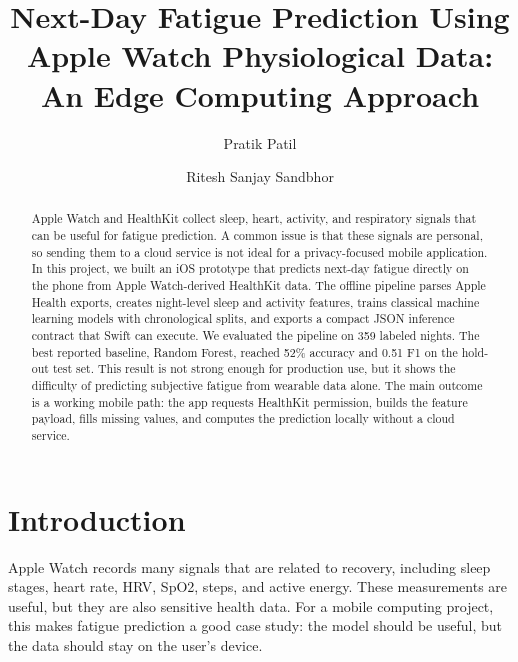 \documentclass[sigconf,10pt]{acmart}
\begin{document}
\title{Next-Day Fatigue Prediction Using Apple Watch Physiological Data: An Edge Computing Approach}

\author{Pratik Patil}

\author{Ritesh Sanjay Sandbhor}

\renewcommand{\shortauthors}{Pratik Patil and Ritesh Sanjay Sandbhor}

\begin{abstract}
Apple Watch and HealthKit collect sleep, heart, activity, and respiratory signals that can be useful for fatigue prediction. A common issue is that these signals are personal, so sending them to a cloud service is not ideal for a privacy-focused mobile application. In this project, we built an iOS prototype that predicts next-day fatigue directly on the phone from Apple Watch-derived HealthKit data. The offline pipeline parses Apple Health exports, creates night-level sleep and activity features, trains classical machine learning models with chronological splits, and exports a compact JSON inference contract that Swift can execute. We evaluated the pipeline on 359 labeled nights. The best reported baseline, Random Forest, reached 52\% accuracy and 0.51 F1 on the hold-out test set. This result is not strong enough for production use, but it shows the difficulty of predicting subjective fatigue from wearable data alone. The main outcome is a working mobile path: the app requests HealthKit permission, builds the feature payload, fills missing values, and computes the prediction locally without a cloud service.
\end{abstract}


\maketitle

\section{Introduction}

Apple Watch records many signals that are related to recovery, including sleep stages, heart rate, HRV, SpO2, steps, and active energy. These measurements are useful, but they are also sensitive health data. For a mobile computing project, this makes fatigue prediction a good case study: the model should be useful, but the data should stay on the user's device.
\end{document}
